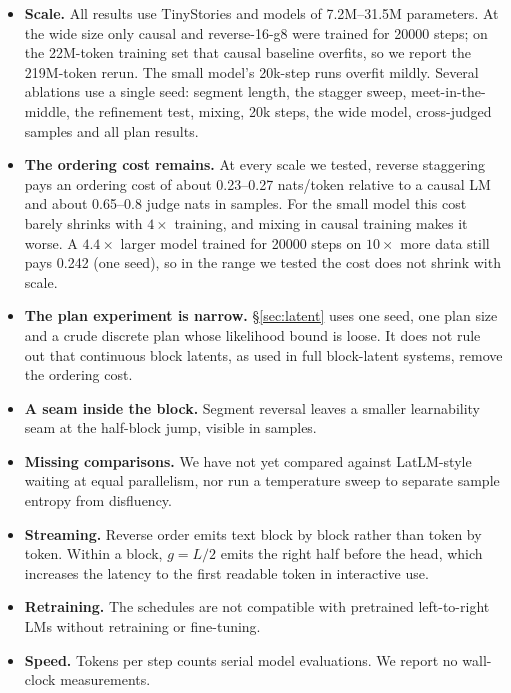 \documentclass[11pt]{article}
\theoremstyle{definition}
\theoremstyle{remark}
\newcommand{\sch}[1]{\textsf{#1}}
\begin{document}
\begin{itemize}
  \item \textbf{Scale.} All results use TinyStories and models of 7.2M--31.5M parameters. At the wide size only \sch{causal} and \sch{reverse-16-g8} were trained for 20000 steps; on the 22M-token training set that causal baseline overfits, so we report the 219M-token rerun. The small model's 20k-step runs overfit mildly. Several ablations use a single seed: segment length, the stagger sweep, meet-in-the-middle, the refinement test, mixing, 20k steps, the wide model, cross-judged samples and all plan results.
  \item \textbf{The ordering cost remains.} At every scale we tested, reverse staggering pays an ordering cost of about 0.23--0.27 nats/token relative to a causal LM and about 0.65--0.8 judge nats in samples. For the small model this cost barely shrinks with $4\times$ training, and mixing in causal training makes it worse. A $4.4\times$ larger model trained for 20000 steps on $10\times$ more data still pays 0.242 (one seed), so in the range we tested the cost does not shrink with scale.
  \item \textbf{The plan experiment is narrow.} \S\ref{sec:latent} uses one seed, one plan size and a crude discrete plan whose likelihood bound is loose. It does not rule out that continuous block latents, as used in full block-latent systems, remove the ordering cost.
  \item \textbf{A seam inside the block.} Segment reversal leaves a smaller learnability seam at the half-block jump, visible in samples.
  \item \textbf{Missing comparisons.} We have not yet compared against LatLM-style waiting at equal parallelism, nor run a temperature sweep to separate sample entropy from disfluency.
  \item \textbf{Streaming.} Reverse order emits text block by block rather than token by token. Within a block, $g=L/2$ emits the right half before the head, which increases the latency to the first readable token in interactive use.
  \item \textbf{Retraining.} The schedules are not compatible with pretrained left-to-right LMs without retraining or fine-tuning.
  \item \textbf{Speed.} Tokens per step counts serial model evaluations. We report no wall-clock measurements.
\end{itemize}

\end{document}

